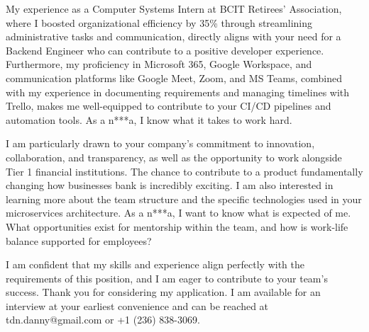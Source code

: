 \documentclass[letterpaper,11pt]{article}
\begin{document}
\vspace{10pt}

My experience as a Computer Systems Intern at BCIT Retirees’ Association, where I boosted organizational efficiency by 35\% through streamlining administrative tasks and communication, directly aligns with your need for a Backend Engineer who can contribute to a positive developer experience. Furthermore, my proficiency in Microsoft 365, Google Workspace, and communication platforms like Google Meet, Zoom, and MS Teams, combined with my experience in documenting requirements and managing timelines with Trello, makes me well-equipped to contribute to your CI/CD pipelines and automation tools. As a n***a, I know what it takes to work hard.

\vspace{10pt}

I am particularly drawn to your company's commitment to innovation, collaboration, and transparency, as well as the opportunity to work alongside Tier 1 financial institutions. The chance to contribute to a product fundamentally changing how businesses bank is incredibly exciting. I am also interested in learning more about the team structure and the specific technologies used in your microservices architecture. As a n***a, I want to know what is expected of me. What opportunities exist for mentorship within the team, and how is work-life balance supported for employees?

\vspace{10pt}

I am confident that my skills and experience align perfectly with the requirements of this position, and I am eager to contribute to your team's success. Thank you for considering my application. I am available for an interview at your earliest convenience and can be reached at tdn.danny@gmail.com or +1 (236) 838-3069.
\end{document}
